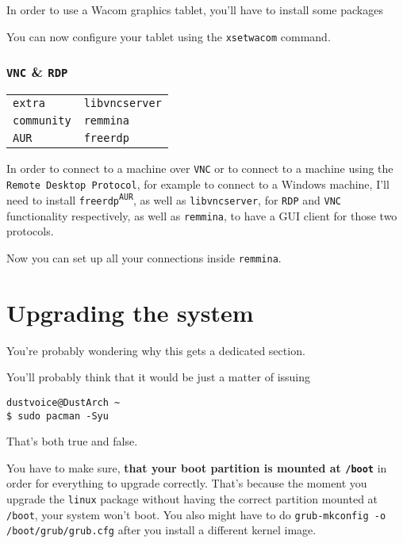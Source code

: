 \documentclass[9pt]{report}
\newenvironment{packagetable}
{\begin{longtabu}to \textwidth [b]{X[1,r]|X[1,l]}}
{\end{longtabu}}
\begin{document}
In order to use a Wacom graphics tablet, you’ll have to install some packages


You can now configure your tablet using the \texttt{xsetwacom} command.



\newpage

\hypertarget{x-vnc-and-rdp}{\subsection{\texttt{VNC} \& \texttt{RDP}}}
\begin{packagetable}
    \texttt{extra} & \texttt{libvncserver} \\ 
    \texttt{community} & \texttt{remmina} \\ 
    \texttt{AUR} & \texttt{freerdp} \\ 
\end{packagetable}

In order to connect to a machine over \texttt{VNC} or to connect to a machine using the \texttt{Remote Desktop Protocol}, for example to connect to a Windows machine, I’ll need to install \texttt{freerdp\textsuperscript{\texttt{AUR}}}, as well as \texttt{libvncserver}, for \texttt{RDP} and \texttt{VNC} functionality respectively, as well as \texttt{remmina}, to have a GUI client for those two protocols.


Now you can set up all your connections inside \texttt{remmina}.



\newpage

\hypertarget{x-upgrading-the-system}{\chapter{Upgrading the system}}
You’re probably wondering why this gets a dedicated section.


You’ll probably think that it would be just a matter of issuing


\begin{verbatim}
dustvoice@DustArch ~
$ sudo pacman -Syu
\end{verbatim}

That’s both true and false.


You have to make sure, \textbf{that your boot partition is mounted at \texttt{/boot}} in order for everything to upgrade correctly.
That’s because the moment you upgrade the \texttt{linux} package without having the correct partition mounted at \texttt{/boot}, your system won’t boot.
You also might have to do \texttt{grub-mkconfig -o /boot/grub/grub.cfg} after you install a different kernel image.
\end{document}
